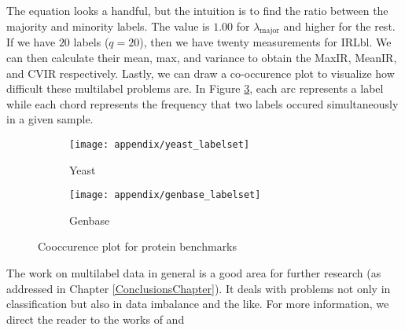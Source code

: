 \par The equation looks a handful, but the intuition is to find the ratio
between the majority and minority labels. The value is $1.00$ for
$\lambda_{\text{major}}$ and higher for the rest. If we have $20$ labels
($q=20$), then we have twenty measurements for IRLbl. We can then calculate
their mean, max, and variance to obtain the MaxIR, MeanIR, and CVIR
respectively. Lastly, we can draw a co-occurence plot to visualize how
difficult these multilabel problems are. In Figure \ref{appendix:cooccurence},
each arc represents a label while each chord represents the frequency that two
labels occured simultaneously in a given sample.

\begin{figure}[!h]
  \centering
  \begin{subfigure}[b]{0.48\textwidth}
    \texttt{[image: appendix/yeast\_labelset]}
    \caption{Yeast}
    \label{cooccurence:yeast}
  \end{subfigure}
  \begin{subfigure}[b]{0.48\textwidth}
    \texttt{[image: appendix/genbase\_labelset]}
    \caption{Genbase}
    \label{cooccurence:genbase}
  \end{subfigure}
  \caption{Cooccurence plot for protein benchmarks}
  \label{appendix:cooccurence}
\end{figure}

\par The work on multilabel data in general is a good area for further research
(as addressed in Chapter \ref{ConclusionsChapter}). It deals with problems not
only in classification but also in data imbalance and the like. For more
information, we direct the reader to the works of \cite{charte2015imbalance,
charte2015mlsmote} and \cite{ charte2017dealing}
